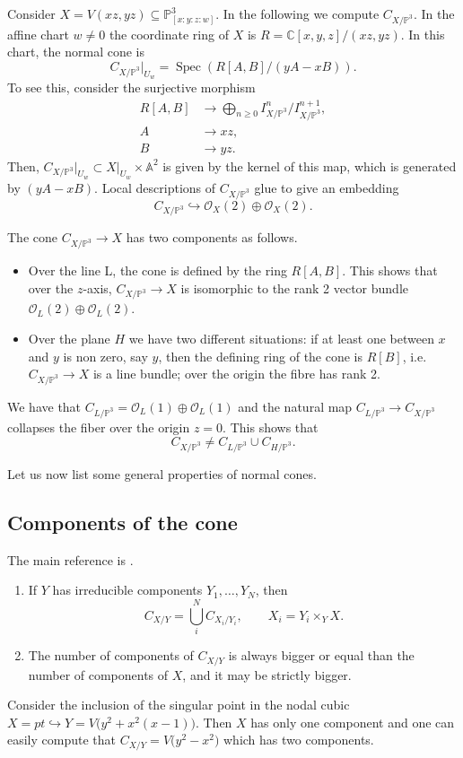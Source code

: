 \documentclass[pdftex]{sigma}
\numberwithin{equation}{section}
\newcommand{\PP}{\mathbb P}
\begin{document}
\begin{Example}\label{main example cone}
Consider $X=V(xz,yz)\subseteq\PP^3_{[x:y:z:w]}$. In the following we compute $C_{X/\PP^3}$. In the affine chart $w\neq 0$ the coordinate ring of $X$ is $R=\mathbb C[x,y,z]/(xz,yz)$. In this chart, the normal cone is
\[
C_{X/\PP^3}\rvert_{U_w}=\operatorname{Spec}\left(R[A,B]/(yA-xB)\right).
\]
To see this, consider the surjective morphism
 \begin{align*}
 R[A,B] & \rightarrow \bigoplus_{n\geq 0}{I^n_{X/\PP^3}/I^{n+1}_{X/\PP^3}},\\
 A &\rightarrow xz,\\
 B &\rightarrow yz.
 \end{align*}
Then, $C_{X/\PP^3}\rvert_{U_w}\subset X\rvert_{U_w}\times \mathbb{A}^2$ is given by the kernel of this map, which is generated by $(yA-xB)$. Local descriptions of $C_{X/\PP^3}$ glue to give an embedding
 \[
 C_{X/\PP^3}\hookrightarrow\mathcal O_X(2)\oplus\mathcal O_X(2).
 \]

The cone $C_{X/\PP^3}\to X$ has two components as follows.
\begin{itemize}\itemsep=0pt
\item Over the line L, the cone is defined by the ring $R[A,B]$. This shows that over the $z$-axis, $C_{X/\PP^3}\to X$ is isomorphic to the rank 2 vector bundle $\mathcal{O}_L(2)\oplus\mathcal O_L(2)$.
\item Over the plane $H$ we have two different situations: if at least one between $x$ and $y$ is non zero, say $y$, then the defining ring of the cone is $R[B]$, i.e. $C_{X/\PP^3}\to X$ is a line bundle; over the origin the fibre has rank 2.
\end{itemize}
We have that $C_{L/\PP^3}=\mathcal{O}_L(1)\oplus\mathcal O_L(1)$ and the natural map $C_{L/\PP^3}\to C_{X/\PP^3}$ collapses the fiber over the origin $z=0$. This shows that
\[C_{X/\PP^3}\neq C_{L/\PP^3}\cup C_{H/\PP^3}.\]

\end{Example}


Let us now list some general properties of normal cones.

\subsection{Components of the cone} The main reference is \cite[Section~4.1]{Fulton}.
\begin{enumerate}\itemsep=0pt
\item If $Y$ has irreducible components $Y_1,\dots, Y_N$, then
 \[C_{X/Y}=\bigcup_i^N C_{X_i/Y_i},\qquad X_i=Y_i\times_Y X.\]
 \item The number of components of $C_{X/Y}$ is always bigger or equal than the number of components of $X$, and it may be strictly bigger.
\end{enumerate}
 \begin{Example}Consider the inclusion of the singular point in the nodal cubic $X=pt\hookrightarrow Y=V\big(y^2+x^2(x-1)\big)$. Then $X$ has only one component and one can easily compute that $C_{X/Y}=V\big(y^2-x^2\big)$ which has two components.
 \end{Example}
\end{document}
